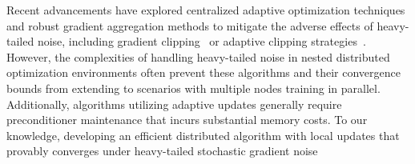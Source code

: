 Recent advancements have explored centralized adaptive optimization techniques and robust gradient aggregation methods to mitigate the adverse effects of heavy-tailed noise, including gradient clipping~\cite{heavytail2, CentralClip, CentralClip5, highprobabilityunboundedvariance, highprobClip, CentralClip1} or adaptive clipping strategies~\cite{HighProbAdaGConv}. 
However, the complexities of handling heavy-tailed noise in nested distributed optimization environments often prevent these algorithms and their convergence bounds from extending to scenarios with multiple nodes training in parallel. %
Additionally, algorithms utilizing adaptive updates generally require preconditioner maintenance that incurs substantial memory costs.
To our knowledge, developing an efficient  distributed algorithm with local updates that provably converges under heavy-tailed stochastic gradient noise %
